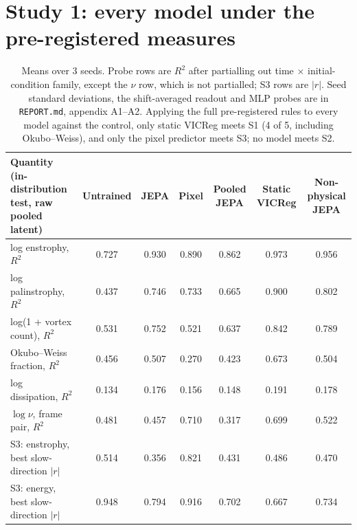 \documentclass[10pt]{article}
\begin{document}
\label{endofmaintext}



\clearpage
\appendix
{}\label{startofappendix}
\renewcommand{\thetable}{\thesection\arabic{table}}\renewcommand{\theHtable}{\thesection.\arabic{table}}
\renewcommand{\thefigure}{\thesection\arabic{figure}}\renewcommand{\theHfigure}{\thesection.\arabic{figure}}
\section{Study 1: every model under the pre-registered measures}\label{app:A}

\begin{table}[htbp]
\centering
\footnotesize
\caption{Means over 3 seeds. Probe rows are $R^2$ after partialling out time $\times$ initial-condition family, except the $\nu$ row, which is not partialled; S3 rows are $|r|$. Seed standard deviations, the shift-averaged readout and MLP probes are in \texttt{REPORT.md}, appendix A1--A2. Applying the full pre-registered rules to every model against the control, only static VICReg meets S1 (4 of 5, including Okubo--Weiss), and only the pixel predictor meets S3; no model meets S2.}
\label{tab:A1}
\begin{tabularx}{\linewidth}{>{\raggedright\arraybackslash}Xcccccc}
\toprule
Quantity (in-distribution test, raw pooled latent) & Untrained & JEPA & Pixel & Pooled JEPA & Static VICReg & Non-physical JEPA \\
\midrule
log enstrophy, $R^2$ & 0.727 & 0.930 & 0.890 & 0.862 & 0.973 & 0.956 \\
log palinstrophy, $R^2$ & 0.437 & 0.746 & 0.733 & 0.665 & 0.900 & 0.802 \\
log(1 + vortex count), $R^2$ & 0.531 & 0.752 & 0.521 & 0.637 & 0.842 & 0.789 \\
Okubo--Weiss fraction, $R^2$ & 0.456 & 0.507 & 0.270 & 0.423 & 0.673 & 0.504 \\
log dissipation, $R^2$ & 0.134 & 0.176 & 0.156 & 0.148 & 0.191 & 0.178 \\
$\log\nu$, frame pair, $R^2$ & 0.481 & 0.457 & 0.710 & 0.317 & 0.699 & 0.522 \\
S3: enstrophy, best slow-direction $|r|$ & 0.514 & 0.356 & 0.821 & 0.431 & 0.486 & 0.470 \\
S3: energy, best slow-direction $|r|$ & 0.948 & 0.794 & 0.916 & 0.702 & 0.667 & 0.734 \\
\bottomrule
\end{tabularx}
\end{table}
\end{document}
